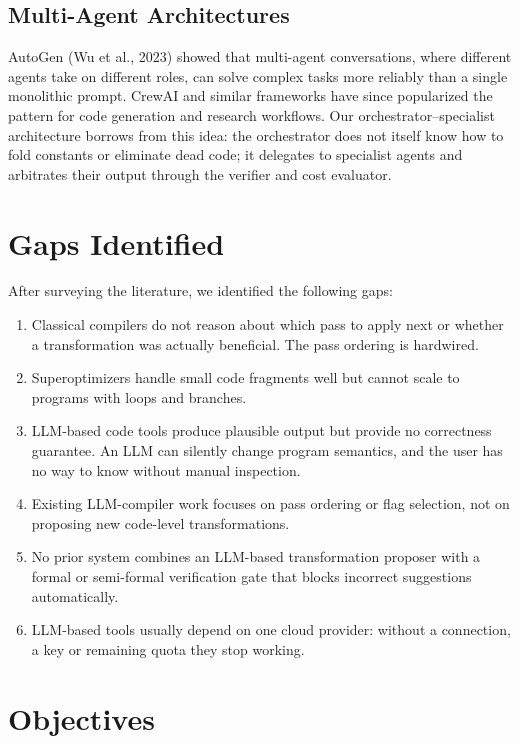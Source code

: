 \documentclass[12pt,a4paper]{report}
\begin{document}
\subsection{Multi-Agent Architectures}

AutoGen (Wu et al., 2023) showed that multi-agent conversations, where different agents take on different roles, can solve complex tasks more reliably than a single monolithic prompt. CrewAI and similar frameworks have since popularized the pattern for code generation and research workflows. Our orchestrator--specialist architecture borrows from this idea: the orchestrator does not itself know how to fold constants or eliminate dead code; it delegates to specialist agents and arbitrates their output through the verifier and cost evaluator.

\section{Gaps Identified}

After surveying the literature, we identified the following gaps:
\begin{enumerate}[leftmargin=2cm]
  \item Classical compilers do not reason about which pass to apply next or whether a transformation was actually beneficial. The pass ordering is hardwired.
  \item Superoptimizers handle small code fragments well but cannot scale to programs with loops and branches.
  \item LLM-based code tools produce plausible output but provide no correctness guarantee. An LLM can silently change program semantics, and the user has no way to know without manual inspection.
  \item Existing LLM-compiler work focuses on pass ordering or flag selection, not on proposing new code-level transformations.
  \item No prior system combines an LLM-based transformation proposer with a formal or semi-formal verification gate that blocks incorrect suggestions automatically.
  \item LLM-based tools usually depend on one cloud provider: without a connection, a key or remaining quota they stop working.
\end{enumerate}

\section{Objectives}
\end{document}
